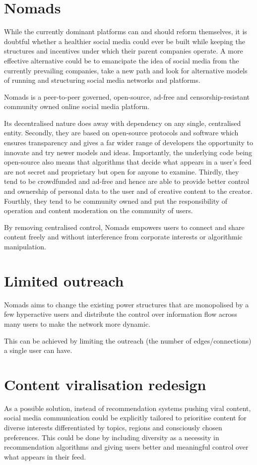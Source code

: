 \documentclass{sistedes}
\begin{document}
\section{Nomads}
While the currently dominant platforms can and should reform themselves, it is doubtful whether a healthier social media could ever be built while keeping the structures and incentives under which their parent companies operate. A more effective alternative could be to emancipate the idea of social media from the currently prevailing companies, take a new path and look for alternative models of running and structuring social media networks and platforms.

Nomads is a peer-to-peer governed, open-source, ad-free and censorship-resistant community owned online social media platform.

Its decentralised nature does away with dependency on any single, centralised entity. Secondly, they are based on open-source protocols and software which ensures transparency and gives a far wider range of developers the opportunity to innovate and try newer models and ideas. Importantly, the underlying code being open-source also means that algorithms that decide what appears in a user’s feed are not secret and proprietary but open for anyone to examine. Thirdly, they tend to be crowdfunded and ad-free and hence are able to provide better control and ownership of personal data to the user and of creative content to the creator. Fourthly, they tend to be community owned and put the responsibility of operation and content moderation on the community of users.

By removing centralised control, Nomads empowers users to connect and share content freely and without interference from corporate interests or algorithmic manipulation.

\section{Limited outreach}
Nomads aims to change the existing power structures that are monopolised by a few hyperactive users and distribute the control over information flow across many users to make the network more dynamic. 

This can be achieved by limiting the outreach (the number of edges/connections) a single user can have.

\section{Content viralisation redesign}
As a possible solution, instead of recommendation systems pushing viral content, social media communication could be explicitly tailored to prioritise content for diverse interests differentiated by topics, regions and consciously chosen preferences. This could be done by including diversity as a necessity in recommendation algorithms and giving users better and meaningful control over what appears in their feed.
\end{document}
